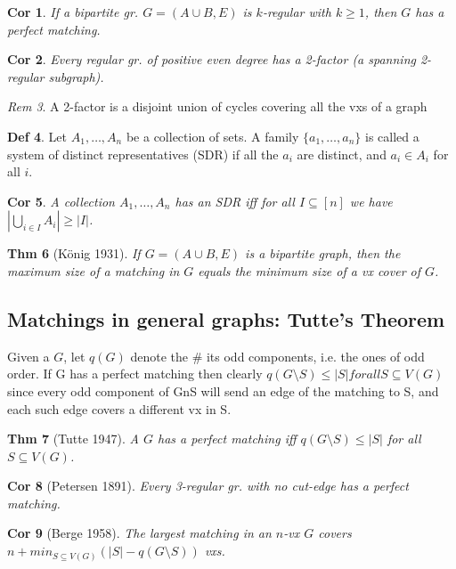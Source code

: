 \documentclass[11pt, fleqn, a4paper, landscape]{article}
\theoremstyle{plain} %
\newtheorem{thm}{Thm}
\newtheorem{cor}[thm]{Cor}
\theoremstyle{remark} %
\newtheorem{rem}[thm]{Rem}
\theoremstyle{definition} %
\newtheorem{defi}[thm]{Def}
\begin{document}
\begin{multicols}{5}
\begin{cor}
If a bipartite gr. $G = (A \cup B,E) $ is $k$-regular with $k \ge 1$, then $G$ has a perfect matching.
\end{cor}

\begin{cor}
Every regular gr. of positive even degree has a 2-factor (a spanning 2-regular subgraph).
\end{cor}

\begin{rem}
A 2-factor is a disjoint union of cycles covering all the vxs of a graph
\end{rem}

\begin{defi}
Let $A_1, \dots ,A_n$ be a collection of sets. A family $\{a_1, \dots , a_n\}$  is called a system of distinct representatives (SDR) if all the $a_i$ are distinct, and $a_i \in A_i$ for all $i$.
\end{defi}

\begin{cor}
A collection $A_1, \dots ,A_n$ has an SDR iff for all $I \subseteq [n]$ we have $|\bigcup_{i\in I} A_i|\ge|I|$.
\end{cor}
\addtocounter{thm}{1}
\begin{thm}[König 1931]
If $G = (A \cup B,E)$ is a bipartite graph, then the maximum size of a
matching in $G$ equals the minimum size of a vx cover of $G$.
\end{thm}

\subsection{Matchings in general graphs: Tutte’s Theorem}
Given a $G$, let $q(G)$ denote the \# its odd components, i.e. the ones of odd order. If G has a perfect matching then clearly
$q(G\setminus S) \le|S|for all S \subseteq V (G)$
since every odd component of GnS will send an edge of the matching to S, and each such edge covers a different vx in S.

\begin{thm}[Tutte 1947]
A $G$ has a perfect matching iff $q(G\setminus S) \le|S|$ for
all $S \subseteq V (G)$.
\end{thm}

\begin{cor}[Petersen 1891]
Every 3-regular gr. with no cut-edge has a perfect matching.
\end{cor}
\addtocounter{thm}{1}
\begin{cor}[Berge 1958]
The largest matching in an $n$-vx $G$ covers $n+min_{S\subseteq V (G)}(|S|- q(G\setminus S))$ vxs.
\end{cor}


\end{multicols}
\end{document}
